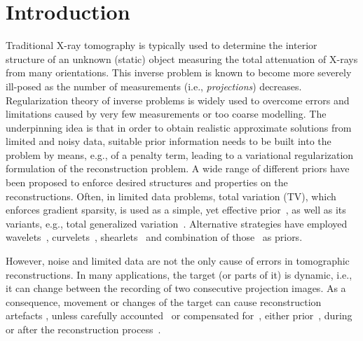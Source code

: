 \documentclass[11pt,a4paper]{article}
\numberwithin{equation}{section}
\begin{document}
\section{Introduction} \label{sec:intro}
Traditional X-ray tomography is typically used to determine the interior structure of an unknown (static) object measuring the total attenuation of X-rays from many orientations. This inverse problem is known to become more severely ill-posed as the number of measurements (i.e., \emph{projections}) decreases. Regularization theory of inverse problems is widely used to overcome errors and limitations caused by very few measurements or too coarse modelling. The underpinning idea is that in order to obtain realistic approximate solutions from limited and noisy data, suitable prior information needs to be built into the problem by means, e.g., of a penalty term, leading to a variational regularization formulation of the reconstruction problem. A wide range of different priors have been proposed to enforce desired structures and properties on the reconstructions. Often, in limited data problems, total variation (TV), which enforces gradient sparsity, is used as a simple, yet effective prior~\cite{Chen2013,Jorgensen2015,Liu2012,Sydky2008,Sydky2006,Tian2011}, as well as its variants, e.g., total generalized variation~\cite{Niu2014}. Alternative strategies have employed wavelets~\cite{Hamalainen2013,Jia2011,Loris2006,Niinimaki2007,rantala2006wavelet,goossens2020}, curvelets~\cite{Candes2000,Frikel13},  shearlets~\cite{Bubba2018,Colonna2010,Guo2013,Riis2018,vandeghinste2013} and combination of those~\cite{goppel2024data} as priors.


However, noise and limited data are not the only cause of  errors in tomographic recon\-structions. In many applications, the target (or parts of it) is dynamic, i.e., it can change between the recording of two consecutive projection images. As a consequence, movement or changes of the target can cause reconstruction artefacts  \cite{milanfar1999model, mutaf2007impact}, unless carefully accounted~\cite{blanke2020inverse} or compensated for~\cite{desbat2007compensation, isola2008motion, hahn2017motion}, either prior~\cite{lu2002tomographic}, during~\cite{van2012combined, niemi2015dynamic, burger2017variational, chen2019new, lunz2021learned, liu2021rethinking} or after the reconstruction process~\cite{ritchie1994predictive, gravier2007tomographic}. 
\end{document}
